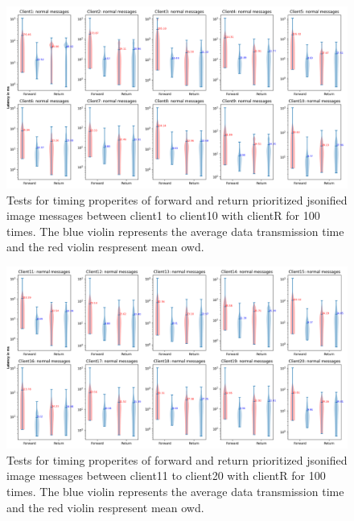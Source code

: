 \begin{figure}
    \centering
    \includegraphics[width=\textheight]{figures/appendix/priority_tests/log_violin_50clients_image_figure_1.png}\hfill 
    \caption{Tests for timing properites of forward and return prioritized jsonified image messages between client1 to client10 
    with clientR for 100 times. The blue violin represents the average data transmission time and the red violin 
    respresent mean \gls{owd}.} \label{fig: priority-50clients-image-a}
\end{figure}

\begin{figure}
    \includegraphics[width=\textheight]{figures/appendix/priority_tests/log_violin_50clients_image_figure_2.png}\hfill 
    \caption{Tests for timing properites of forward and return prioritized jsonified image messages between client11 to client20 
    with clientR for 100 times. The blue violin represents the average data transmission time and the red violin 
    respresent mean \gls{owd}.} \label{fig: priority-50clients-image-b}
\end{figure}

